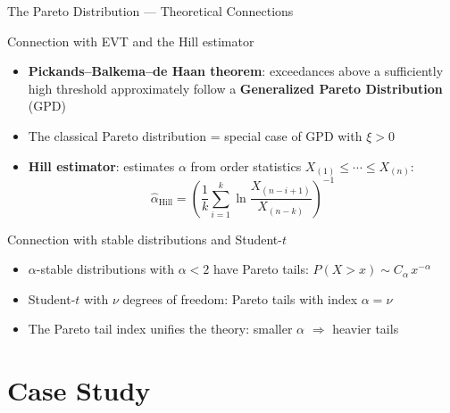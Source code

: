 \documentclass[9pt, aspectratio=169, t]{beamer}
\theoremstyle{definition}
\begin{document}
\begin{frame}{The Pareto Distribution --- Theoretical Connections}
\small
\vspace{-0.3cm}
\begin{block}{Connection with EVT and the Hill estimator}
\begin{itemize}\setlength\itemsep{1pt}
\item \textbf{Pickands--Balkema--de Haan theorem}: exceedances above a sufficiently high threshold approximately follow a \textbf{Generalized Pareto Distribution} (GPD)
\item The classical Pareto distribution = special case of GPD with $\xi > 0$
\item \textbf{Hill estimator}: estimates $\alpha$ from order statistics $X_{(1)} \leq \cdots \leq X_{(n)}$:
\[
\hat{\alpha}_{\text{Hill}} = \left(\frac{1}{k}\sum_{i=1}^{k} \ln \frac{X_{(n-i+1)}}{X_{(n-k)}}\right)^{-1}
\]
\end{itemize}
\end{block}

\begin{block}{Connection with stable distributions and Student-$t$}
\begin{itemize}\setlength\itemsep{1pt}
\item $\alpha$-stable distributions with $\alpha < 2$ have Pareto tails: $P(X > x) \sim C_\alpha\, x^{-\alpha}$
\item Student-$t$ with $\nu$ degrees of freedom: Pareto tails with index $\alpha = \nu$
\item The Pareto tail index unifies the theory: smaller $\alpha$ $\Rightarrow$ heavier tails
\end{itemize}
\end{block}
\end{frame}



\section{Case Study}
\end{document}

